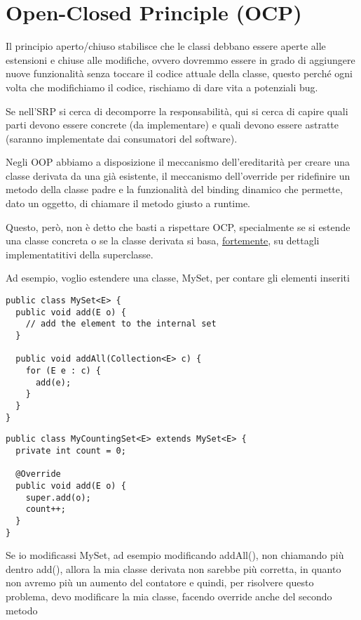 \section{Open-Closed Principle (OCP)}

Il principio aperto/chiuso stabilisce che le classi debbano essere aperte alle estensioni e chiuse alle modifiche, ovvero dovremmo essere in grado di aggiungere nuove 
funzionalità senza toccare il codice attuale della classe, questo perché ogni volta che modifichiamo il codice, rischiamo di dare vita a potenziali bug.
\smallskip

Se nell'SRP si cerca di decomporre la responsabilità, qui si cerca di capire quali parti devono essere concrete (da implementare) e quali devono essere astratte 
(saranno implementate dai consumatori del software).
\smallskip

Negli OOP abbiamo a disposizione il meccanismo dell'ereditarità per creare una classe derivata da una già esistente, il meccanismo dell'override per ridefinire un metodo 
della classe padre e la funzionalità del binding dinamico che permette, dato un oggetto, di chiamare il metodo giusto a runtime.

Questo, però, non è detto che basti a rispettare OCP, specialmente se si estende una classe concreta o se la classe derivata si basa, \underline{fortemente}, su 
dettagli implementatitivi della superclasse.

Ad esempio, voglio estendere una classe, MySet, per contare gli elementi inseriti

\begin{multicols}{2}
\begin{lstlisting}
public class MySet<E> {
  public void add(E o) {
    // add the element to the internal set
  }

  public void addAll(Collection<E> c) {
    for (E e : c) {
      add(e);
    }
  }
}
\end{lstlisting}
\columnbreak
\begin{lstlisting}
public class MyCountingSet<E> extends MySet<E> {
  private int count = 0;
  
  @Override
  public void add(E o) {
    super.add(o);
    count++;
  }
} 
\end{lstlisting}
\end{multicols}

\newpage
Se io modificassi MySet, ad esempio modificando addAll(), non chiamando più dentro add(), allora la mia classe derivata non sarebbe più corretta, in quanto non avremo 
più un aumento del contatore e quindi, per risolvere questo problema, devo modificare la mia classe, facendo override anche del secondo metodo

